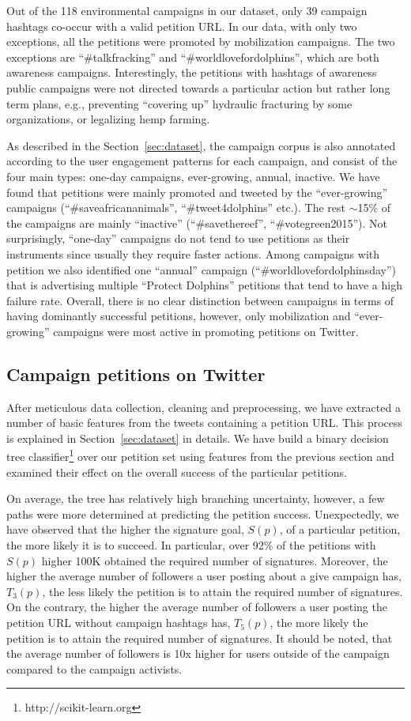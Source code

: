 Out of the 118 environmental campaigns in our dataset, only 39 campaign hashtags co-occur with a valid petition URL.
In our data, with only two exceptions, all the petitions were promoted by mobilization campaigns. The two exceptions are ``\#talkfracking'' and ``\#worldlovefordolphins'', which are both awareness campaigns.
Interestingly, the petitions with hashtags of awareness public campaigns were not directed towards a particular action but rather long term plans, e.g., preventing ``covering up'' hydraulic fracturing by some organizations, or legalizing hemp farming.

As described in the Section~\ref{sec:dataset}, the campaign corpus is also annotated according to the user engagement patterns for each campaign, and consist of the four main types: one-day campaigns, ever-growing, annual, inactive.
We have found that petitions were mainly promoted and tweeted by the ``ever-growing'' campaigns (``\#saveafricananimals'', ``\#tweet4dolphins'' etc.).
The rest $\sim$15\% of the campaigns are mainly ``inactive'' (``\#savethereef'', ``\#votegreen2015'').
Not surprisingly, ``one-day'' campaigns do not tend to use petitions as their instruments since usually they require faster actions.
Among campaigns with petition we also identified one ``annual'' campaign (``\#worldlovefordolphinsday'') that is advertising multiple ``Protect Dolphins'' petitions that tend to have a high failure rate.
Overall, there is no clear distinction between campaigns in terms of having dominantly successful petitions, however, only mobilization and ``ever-growing'' campaigns were most active in promoting petitions on Twitter.

\subsection{Campaign petitions on Twitter}
After meticulous data collection, cleaning and preprocessing, we have extracted a number of basic features from the tweets containing a petition URL.
This process is explained in Section~\ref{sec:dataset} in details.
We have build a binary decision tree classifier\footnote{ http://scikit-learn.org } over our petition set using features from the previous section and examined their effect on the overall success of the particular petitions.

On average, the tree has relatively high branching uncertainty, however, a few paths were more determined at predicting the petition success.
Unexpectedly, we have observed that the higher the signature goal, $S(p)$, of a particular petition, the more likely it is to succeed. In particular, over 92\% of the petitions with $S(p)$ higher 100K obtained the required number of signatures.
Moreover, the higher the average number of followers a user posting about a give campaign has, $T_3(p)$, the less likely the petition is to attain the required number of signatures.
On the contrary, the higher the average number of followers a user posting the petition URL without campaign hashtags has, $T_5(p)$, the more likely the petition is to attain the required number of signatures.
It should be noted, that the average number of followers is 10x higher for users outside of the campaign compared to the campaign activists.

